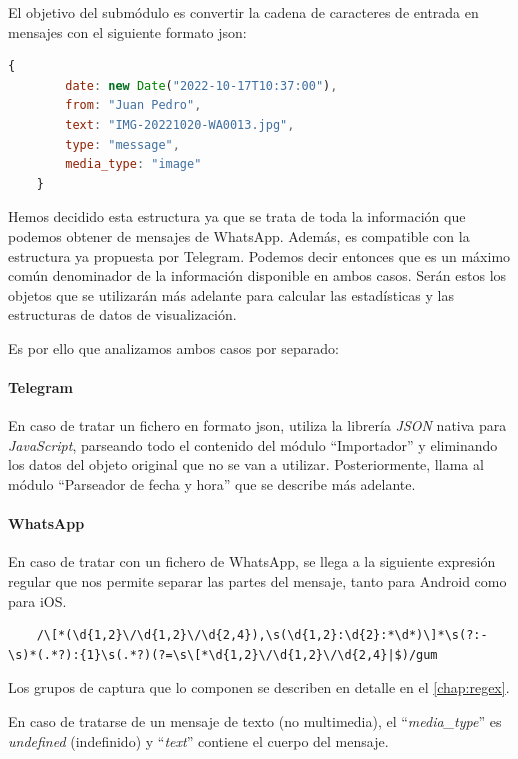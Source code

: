 El objetivo del submódulo es convertir la cadena de caracteres de entrada en mensajes con el siguiente formato \acrshort{json}:

\begin{lstlisting}[language=JavaScript]
	{
		date: new Date("2022-10-17T10:37:00"),
		from: "Juan Pedro",
		text: "IMG-20221020-WA0013.jpg",
		type: "message",
		media_type: "image"
	}
\end{lstlisting}

Hemos decidido esta estructura ya que se trata de toda la información que podemos obtener de mensajes de WhatsApp. Además, es compatible con la estructura ya propuesta por Telegram. Podemos decir entonces que es un máximo común denominador de la información disponible en ambos casos. Serán estos los objetos que se utilizarán más adelante para calcular las estadísticas y las estructuras de datos de visualización.

Es por ello que analizamos ambos casos por separado:

\paragraph{Telegram} En caso de tratar un fichero en formato \acrshort{json}, utiliza la librería \textit{JSON} nativa para \textit{JavaScript}, parseando todo el contenido del módulo ``Importador'' y eliminando los datos del objeto original que no se van a utilizar. Posteriormente, llama al módulo ``Parseador de fecha y hora'' que se describe más adelante.

\paragraph{WhatsApp} En caso de tratar con un fichero de WhatsApp, se llega a la siguiente expresión regular que nos permite separar las partes del mensaje, tanto para Android como para iOS.

\begin{lstlisting}
	/\[*(\d{1,2}\/\d{1,2}\/\d{2,4}),\s(\d{1,2}:\d{2}:*\d*)\]*\s(?:-\s)*(.*?):{1}\s(.*?)(?=\s\[*\d{1,2}\/\d{1,2}\/\d{2,4}|$)/gum
\end{lstlisting}

Los grupos de captura que lo componen se describen en detalle en el \autoref{chap:regex}.

En caso de tratarse de un mensaje de texto (no multimedia), el ``\textit{media\_type}'' es \textit{undefined} (indefinido) y ``\textit{text}'' contiene el cuerpo del mensaje.



